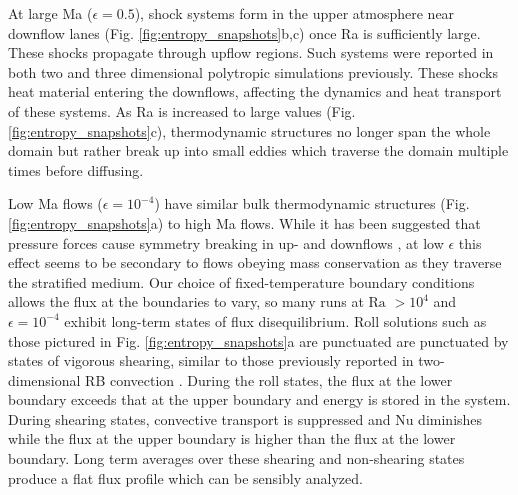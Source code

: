 \documentclass[aps, prl, twocolumn, nofootinbib, groupedaddress, amsfonts, amssymb, amsmath]{revtex4-1}
\begin{document}
At large Ma ($\epsilon = 0.5$), shock systems form in the upper atmosphere near downflow lanes 
(Fig. \ref{fig:entropy_snapshots}b,c) once Ra is sufficiently large.
These shocks propagate through upflow regions.  
Such systems were reported in
both two \cite{cattaneo&all1990} and three \cite{malagoli&all1990} dimensional polytropic simulations previously.
These shocks heat material entering the downflows, affecting the dynamics and heat transport
of these systems.  As Ra is increased to large values 
(Fig. \ref{fig:entropy_snapshots}c), thermodynamic structures 
no longer span the whole domain but rather break up into 
small eddies which traverse the domain multiple
times before diffusing.  

Low Ma flows ($\epsilon = 10^{-4}$)
have similar bulk thermodynamic structures (Fig. \ref{fig:entropy_snapshots}a)
to high Ma flows.
While it has been suggested that pressure forces 
cause symmetry breaking in up- and downflows
\cite{hurlburt&all1984}, at low $\epsilon$ this 
effect seems to be secondary to flows obeying mass conservation as they traverse
the stratified medium.  
Our choice of fixed-temperature boundary conditions allows the flux at the 
boundaries to vary, so many runs at $\text{Ra }> 10^4$
and $\epsilon = 10^{-4}$ exhibit long-term states of
flux disequilibrium.  Roll solutions such as those pictured in Fig. \ref{fig:entropy_snapshots}a
are punctuated are punctuated by states of vigorous shearing, similar to those previously
reported in two-dimensional RB convection \cite{goluskin&all2014}.  
During the roll states, the flux at the lower boundary exceeds that at the upper boundary
and energy is stored in the system.
During shearing states, convective transport is suppressed and Nu diminishes while
the flux at the upper boundary is higher than the flux at the lower boundary.  Long term
averages over these shearing and non-shearing states produce a flat flux profile which
can be sensibly analyzed.
\end{document}
